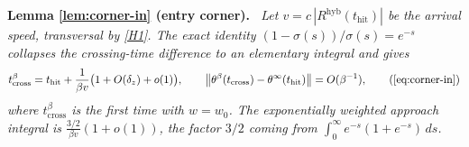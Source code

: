\documentclass[11pt]{article}
\theoremstyle{definition}
\theoremstyle{remark}
\newcommand{\thit}{t_{\mathrm{hit}}}
\newcommand{\hyb}{\mathrm{hyb}}
\newenvironment{lemmarep}[2]{%
  \par\medskip\noindent\textbf{Lemma \ref{#1} (#2).}\itshape\ \ignorespaces}%
  {\par\medskip}
\begin{document}
\begin{lemmarep}{lem:corner-in}{entry corner}
Let $v=c\,|R^{\hyb}(\thit)|$ be the arrival speed, transversal by \eqref{H1}. The
exact identity $(1-\sigma(s))/\sigma(s)=e^{-s}$ collapses the crossing-time
difference to an elementary integral and gives
\begin{equation*}
t_{\mathrm{cross}}^{\beta}=\thit+\frac{1}{\beta v}\bigl(1+O(\delta_z)+o(1)\bigr),
\qquad
\bigl\|\theta^\beta(t_{\mathrm{cross}})-\theta^\infty(\thit)\bigr\|=O(\beta^{-1}),
\tag{\ref{eq:corner-in}}
\end{equation*}
where $t^\beta_{\mathrm{cross}}$ is the first time with $w=w_0$. The
exponentially weighted approach integral is $\tfrac{3/2}{\beta v}(1+o(1))$, the
factor $3/2$ coming from $\int_0^\infty e^{-s}(1+e^{-s})\,ds$.
\end{lemmarep}
\end{document}
